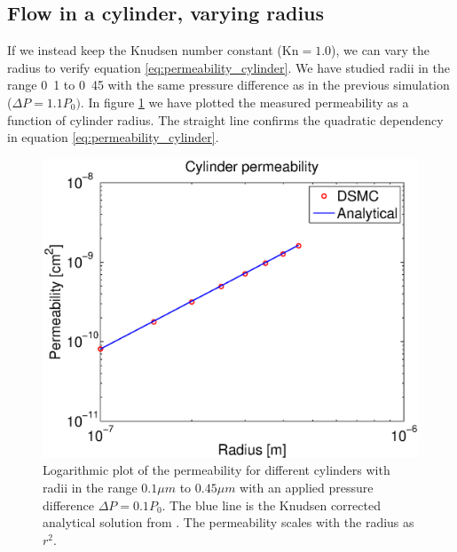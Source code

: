 \subsection{Flow in a cylinder, varying radius}
If we instead keep the Knudsen number constant ($\text{Kn}=1.0$), we can vary the radius to verify equation \eqref{eq:permeability_cylinder}. We have studied radii in the range \unit{0.1}{\micro\meter} to \unit{0.45}{\micro\meter} with the same pressure difference as in the previous simulation ($\Delta P = 1.1P_0)$. In figure \ref{fig:one_cylinder_varying_radii_result} we have plotted the measured permeability as a function of cylinder radius. The straight line confirms the quadratic dependency in equation \eqref{eq:permeability_cylinder}.
\begin{figure}[h]
\begin{center}
\includegraphics[width=\textwidth, trim=0cm 0cm 0cm 0cm, clip]{DSMC/figures/cylinder_radius_permeability.eps}
\end{center}
\caption{Logarithmic plot of the permeability for different cylinders with radii in the range $0.1 \mu m$ to $0.45 \mu m$ with an applied pressure difference $\Delta P = 0.1P_0$. The blue line is the Knudsen corrected analytical solution from \cite{karniadakis2005microflows}. The permeability scales with the radius as $r^2$.}
\label{fig:one_cylinder_varying_radii_result}
\end{figure}

